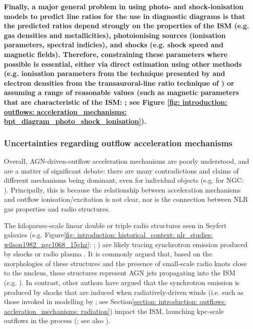 \textbf{Finally, a major general problem in using photo- and shock-ionisation models to predict line ratios for the use in diagnostic diagrams is that the predicted ratios depend strongly on the properties of the ISM (e.g. gas densities and metallicities), photoionising sources (ionisation parameters, spectral indicies), and shocks (e.g. shock speed and magnetic fields). Therefore, constraining these parameters where possible is essential, either via direct estimation using other methods (e.g. ionisation parameters from the technique presented by \citealt{Baron2019a} and electron densities from the transauroral-line ratio technique of \citealt{Holt2011}) or assuming a range of reasonable values (such as magnetic parameters that are characteristic of the ISM: \citealt{Allen2008}; see Figure \ref{fig: introduction: outflows: acceleration_mechanisms: bpt_diagram_photo_shock_ionisation}).}

\subsubsection{Uncertainties regarding outflow acceleration mechanisms}
\label{section: introduction: outflows: accleration_mechanisms: conclusions}

Overall, AGN-driven-outflow acceleration mechanisms are poorly understood, and are a matter of significant debate: there are many contradictions and claims of different mechanisms being dominant, even for individual objects (e.g. for NGC: \citealt{Axon1998, Crenshaw2000_N1068, Das2005, Fischer2017, May2017,  Revalski2021, Meena2023}). Principally, this is because the relationship between acceleration mechanisms and outflow ionisation/excitation is not clear, nor is the connection between NLR gas properties and radio structures.

The kiloparsec-scale linear double or triple radio structures seen in Seyfert galaxies (e.g. Figure\;\ref{fig: introduction: historical_context: nlr_studies: wilson1982_ngc1068_15ghz}: \citealt{Wilson1982}; \citealt{Wilson1980, Pedlar1983, Pedlar1984, Ulvestad1984}) are likely tracing synchrotron emission produced by shocks or radio plasma \citep{Wilson1980, Ulvestad1984}. It is commonly argued that, based on the morphologies of these structures and the presence of small-scale radio knots close to the nucleus, these structures represent AGN jets propagating into the ISM (e.g. \citealt{Wilson1982, Stanghellini2005, Rosario2010b, Riffel2013b, Jarvis2019, Williams2017, Girdhar2022}). In contrast, other authors have argued that the synchrotron emission is produced by shocks that are induced when radiatively-driven winds (i.e. such as those invoked in modelling by \citealt{Hopkins2010}; see Section\;\ref{section: introduction: outflows: accleration_mechanisms: radiation}) impact the ISM, launching kpc-scale outflows in the process (\citealt{Fischer2019}; see also \citealt{Fischer2023}).

